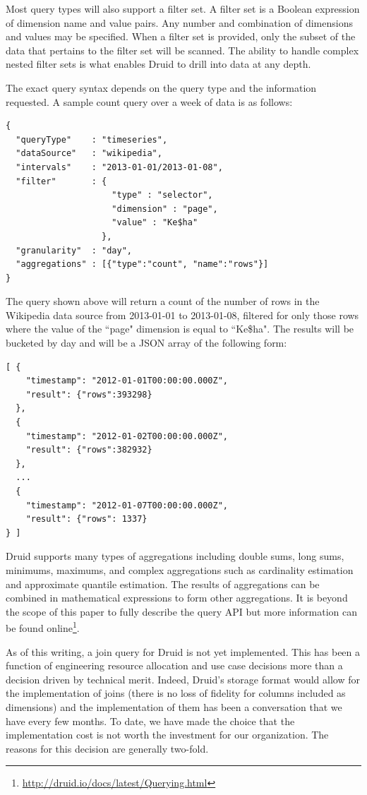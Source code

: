 \documentclass{sig-alternate-2013}
\begin{document}
Most query types will also support a filter set. A filter set is a Boolean
expression of dimension name and value pairs. Any number and combination of
dimensions and values may be specified.  When a filter set is provided, only
the subset of the data that pertains to the filter set will be scanned.  The
ability to handle complex nested filter sets is what enables Druid to drill
into data at any depth.

The exact query syntax depends on the query type and the information requested.
A sample count query over a week of data is as follows:
{\scriptsize\begin{verbatim}
{
  "queryType"    : "timeseries",
  "dataSource"   : "wikipedia",
  "intervals"    : "2013-01-01/2013-01-08",
  "filter"       : {
                     "type" : "selector",
                     "dimension" : "page",
                     "value" : "Ke$ha"
                   },
  "granularity"  : "day",
  "aggregations" : [{"type":"count", "name":"rows"}]
}
\end{verbatim}}
The query shown above will return a count of the number of rows in the Wikipedia data source
from 2013-01-01 to 2013-01-08, filtered for only those rows where the value of the ``page" dimension is 
equal to ``Ke\$ha". The results will be bucketed by day and will be a JSON array of the following form:
{\scriptsize\begin{verbatim}
[ {
    "timestamp": "2012-01-01T00:00:00.000Z",
    "result": {"rows":393298}
  },
  {
    "timestamp": "2012-01-02T00:00:00.000Z",
    "result": {"rows":382932}
  },
  ...
  {
    "timestamp": "2012-01-07T00:00:00.000Z",
    "result": {"rows": 1337}
} ]
\end{verbatim}}

Druid supports many types of aggregations including double sums, long sums,
minimums, maximums, and complex aggregations such as cardinality estimation and
approximate quantile estimation.  The results of aggregations can be combined
in mathematical expressions to form other aggregations. It is beyond the scope
of this paper to fully describe the query API but more information can be found
online\footnote{\href{http://druid.io/docs/latest/Querying.html}{http://druid.io/docs/latest/Querying.html}}.

As of this writing, a join query for Druid is not yet implemented.  This has
been a function of engineering resource allocation and use case decisions more
than a decision driven by technical merit.  Indeed, Druid's storage format
would allow for the implementation of joins (there is no loss of fidelity for
columns included as dimensions) and the implementation of them has been a
conversation that we have every few months.  To date, we have made the choice
that the implementation cost is not worth the investment for our organization.
The reasons for this decision are generally two-fold.
\end{document}
